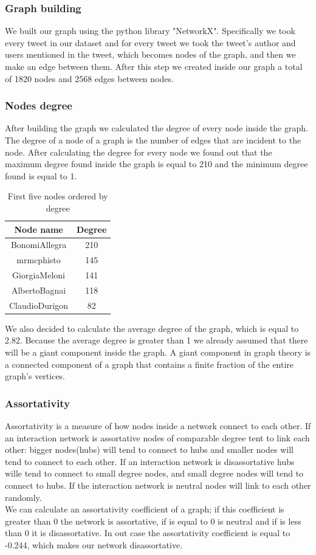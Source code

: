 \documentclass[12pt,journal,compsoc]{IEEEtran}
\begin{document}
\subsubsection{Graph building}
We built our graph using the python library "NetworkX\cite{NetworkX}". Specifically we took every tweet in our dataset and for every tweet we took the tweet's author and users mentioned in the tweet, which becomes nodes of the graph, and then we make an edge between them. After this step we created inside our graph a total of 1820 nodes and 2568 edges between nodes.

\subsubsection{Nodes degree}
After building the graph we calculated the degree of every node inside the graph. The degree of a node of a graph is the number of edges that are incident to the node. After calculating the degree for every node we found out that the maximum degree found inside the graph is equal to 210 and the minimum degree found is equal to 1. 
\begin{table}[ht]
\centering
\begin{tabular}{c c }
	Node name & Degree  \\
	\hline
	BonomiAllegra & 210  \\
	mrmcphisto & 145  \\
	GiorgiaMeloni & 141  \\
	AlbertoBagnai & 118  \\
	ClaudioDurigon & 82  \\
\end{tabular}
\caption{First five nodes ordered by degree}
\end{table}
We also decided to calculate the average degree of the graph, which is equal to 2.82. Because the average degree is greater than 1 we already assumed that there will be a giant component inside the graph. A giant component in graph theory is a connected component of a graph that contains a finite fraction of the entire graph's vertices.

\subsubsection{Assortativity}
Assortativity is a measure of how nodes inside a network connect to each other. If an interaction network is assortative nodes of comparable degree tent to link each other: bigger nodes(hubs) will tend to connect to hubs and smaller nodes will tend to connect to each other. If an interaction network is disassortative hubs wille tend to connect to small degree nodes, and small degree nodes will tend to connect to hubs. If the interaction network is neutral nodes will link to each other randomly.\\
We can calculate an assortativity coefficient of a graph; if this coefficient is greater than 0 the network is assortative, if is equal to 0 is neutral and if is less than 0 it is disassortative.
In out case the assortativity coefficient is equal to -0.244, which makes our network disassortative.
\end{document}
